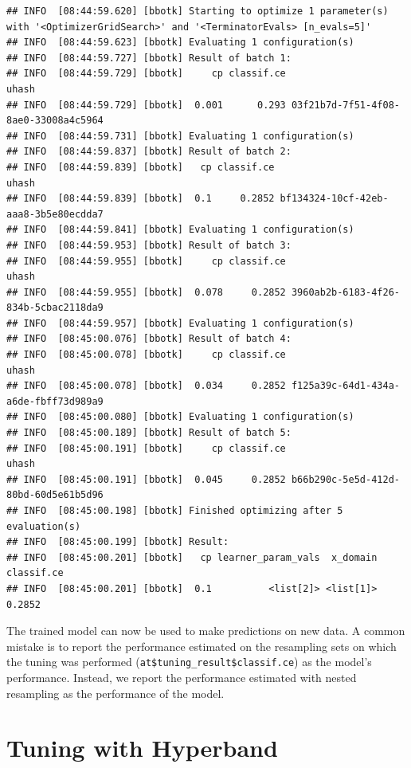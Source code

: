 \documentclass[
]{scrbook}
\begin{document}
\begin{verbatim}
## INFO  [08:44:59.620] [bbotk] Starting to optimize 1 parameter(s) with '<OptimizerGridSearch>' and '<TerminatorEvals> [n_evals=5]' 
## INFO  [08:44:59.623] [bbotk] Evaluating 1 configuration(s) 
## INFO  [08:44:59.727] [bbotk] Result of batch 1: 
## INFO  [08:44:59.729] [bbotk]     cp classif.ce                                uhash 
## INFO  [08:44:59.729] [bbotk]  0.001      0.293 03f21b7d-7f51-4f08-8ae0-33008a4c5964 
## INFO  [08:44:59.731] [bbotk] Evaluating 1 configuration(s) 
## INFO  [08:44:59.837] [bbotk] Result of batch 2: 
## INFO  [08:44:59.839] [bbotk]   cp classif.ce                                uhash 
## INFO  [08:44:59.839] [bbotk]  0.1     0.2852 bf134324-10cf-42eb-aaa8-3b5e80ecdda7 
## INFO  [08:44:59.841] [bbotk] Evaluating 1 configuration(s) 
## INFO  [08:44:59.953] [bbotk] Result of batch 3: 
## INFO  [08:44:59.955] [bbotk]     cp classif.ce                                uhash 
## INFO  [08:44:59.955] [bbotk]  0.078     0.2852 3960ab2b-6183-4f26-834b-5cbac2118da9 
## INFO  [08:44:59.957] [bbotk] Evaluating 1 configuration(s) 
## INFO  [08:45:00.076] [bbotk] Result of batch 4: 
## INFO  [08:45:00.078] [bbotk]     cp classif.ce                                uhash 
## INFO  [08:45:00.078] [bbotk]  0.034     0.2852 f125a39c-64d1-434a-a6de-fbff73d989a9 
## INFO  [08:45:00.080] [bbotk] Evaluating 1 configuration(s) 
## INFO  [08:45:00.189] [bbotk] Result of batch 5: 
## INFO  [08:45:00.191] [bbotk]     cp classif.ce                                uhash 
## INFO  [08:45:00.191] [bbotk]  0.045     0.2852 b66b290c-5e5d-412d-80bd-60d5e61b5d96 
## INFO  [08:45:00.198] [bbotk] Finished optimizing after 5 evaluation(s) 
## INFO  [08:45:00.199] [bbotk] Result: 
## INFO  [08:45:00.201] [bbotk]   cp learner_param_vals  x_domain classif.ce 
## INFO  [08:45:00.201] [bbotk]  0.1          <list[2]> <list[1]>     0.2852
\end{verbatim}

The trained model can now be used to make predictions on new data.
A common mistake is to report the performance estimated on the resampling sets on which the tuning was performed (\texttt{at\$tuning\_result\$classif.ce}) as the model's performance.
Instead, we report the performance estimated with nested resampling as the performance of the model.

\hypertarget{hyperband}{%
\section{Tuning with Hyperband}\label{hyperband}}
\end{document}
